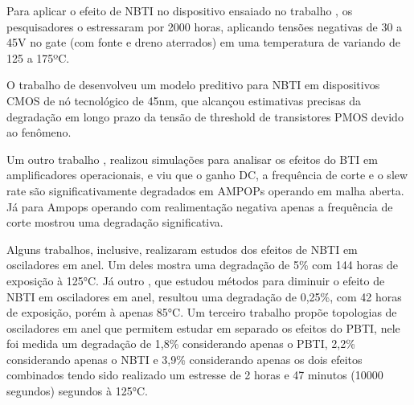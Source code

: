 Para aplicar o efeito de NBTI no dispositivo ensaiado no trabalho \cite{Davidovic}, os pesquisadores o estressaram por 2000 horas, aplicando tensões negativas de 30 a 45V no gate (com fonte e dreno aterrados) em uma temperatura de variando de 125 a 175ºC.

O trabalho de \cite{Bhardwaj} desenvolveu um modelo preditivo para NBTI em dispositivos CMOS de nó tecnológico de 45nm, que alcançou estimativas precisas da degradação em longo prazo da tensão de threshold de transistores PMOS devido ao fenômeno.

Um outro trabalho \cite{Grossi}, realizou simulações para analisar os efeitos do BTI em amplificadores operacionais, e viu que o ganho DC, a frequência de corte e o slew rate são significativamente degradados em AMPOPs operando em malha aberta. Já para Ampops operando com realimentação negativa apenas a frequência de corte mostrou uma degradação significativa.

Alguns trabalhos, inclusive, realizaram estudos dos efeitos de NBTI em osciladores em anel. Um deles \cite{Lorenz} mostra uma degradação de 5\% com 144 horas de exposição à 125°C. Já outro \cite{Sato}, que estudou métodos para diminuir o efeito de NBTI em osciladores em anel, resultou uma degradação de 0,25\%, com 42 horas de exposição, porém à apenas 85°C. Um terceiro trabalho \cite{Linder} propõe topologias de osciladores em anel que permitem estudar em separado os efeitos do PBTI, nele foi medida um degradação de 1,8\% considerando apenas o PBTI, 2,2\% considerando apenas o NBTI e 3,9\%  considerando apenas os dois efeitos combinados tendo sido realizado um estresse de 2 horas e 47 minutos (10000 segundos) segundos à 125°C.
